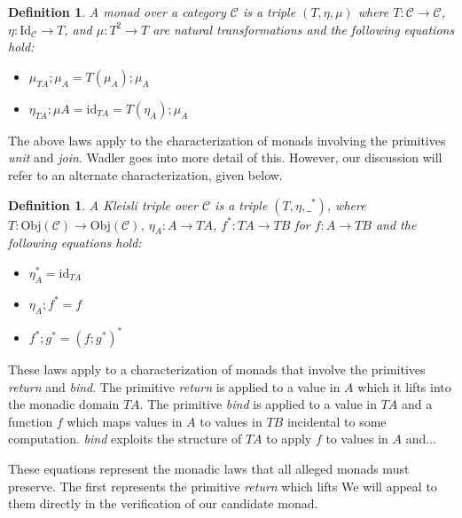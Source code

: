 \documentclass[ms]{byuprop}
\newcounter{definition}
\begin{document}
\newtheorem{monad}[definition]{Definition}

\begin{monad}
A \emph{monad} over a category $\mathcal{C}$ is a triple $(T,\eta,\mu)$ where
$T:\mathcal{C}\rightarrow\mathcal{C}$, $\eta:\mathrm{Id}_{\mathcal{C}}\rightarrow T$, and
$\mu:T^{2}\rightarrow T$ are \emph{natural transformations} and the following equations
hold:

\begin{itemize}
\item $\mu_{TA};\mu_{A}=T(\mu_{A});\mu_{A}$
\item $\eta_{TA};\mu{A}=\mathrm{id}_{TA}=T(\eta_{A});\mu_{A}$
\end{itemize}
\end{monad}

The above laws apply to the characterization of monads involving the primitives
\emph{unit} and \emph{join}. Wadler \cite{wadler1995monads} goes into more detail of this.
However, our discussion will refer to an alternate characterization, given below.

\newtheorem{kleisli}[definition]{Definition}

\begin{kleisli}
A \emph{Kleisli triple} over $\mathcal{C}$ is a triple $(T,\eta,\_^{*})$, where
$T:\mathrm{Obj}(\mathcal{C})\rightarrow \mathrm{Obj}(\mathcal{C})$, $\eta_{A}:A\rightarrow TA$,
$f^{*}:TA\rightarrow TB$ for $f:A\rightarrow TB$ and the following equations hold:

\begin{itemize}
\item $\eta_{A}^{*}=\mathrm{id}_{TA}$
\item $\eta_{A};f^{*}=f$
\item $f^{*};g^{*}=(f;g^{*})^{*}$
\end{itemize}
\end{kleisli}

These laws apply to a characterization of monads that involve the primitives \emph{return}
and \emph{bind}. The primitive \emph{return} is applied to a value in $A$ which it lifts
into the monadic domain $TA$. The primitive \emph{bind} is applied to a value in $TA$ and
a function $f$ which maps values in $A$ to values in $TB$ incidental to some computation.
\emph{bind} exploits the structure of $TA$ to apply $f$ to values in $A$ and...

These equations represent the monadic laws that all alleged monads must preserve. The first represents the primitive \emph{return} which lifts  We will
appeal to them directly in the verification of our candidate monad.
\end{document}
